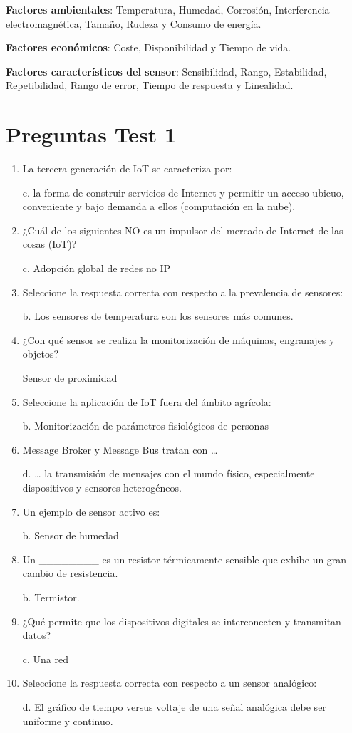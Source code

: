 \documentclass[12pt, twoside, openright]{report} %
\begin{document}
\textbf{Factores ambientales}: Temperatura, Humedad, Corrosión,
Interferencia electromagnética, Tamaño, Rudeza y Consumo de energía.

\textbf{Factores económicos}: Coste, Disponibilidad y Tiempo de vida.

\textbf{Factores característicos del sensor}: Sensibilidad, Rango,
Estabilidad, Repetibilidad, Rango de error, Tiempo de respuesta y
Linealidad.
\pagebreak
\section{Preguntas Test 1}
\begin{enumerate}
	\item La tercera generación de IoT se caracteriza por:

	      c. la forma de construir servicios de Internet y permitir un acceso ubicuo, conveniente y bajo demanda a ellos (computación en la nube).

	\item ¿Cuál de los siguientes NO es un impulsor del mercado de Internet de las cosas (IoT)?

	      c. Adopción global de redes no IP

	\item Seleccione la respuesta correcta con respecto a la prevalencia de sensores:

	      b. Los sensores de temperatura son los sensores más comunes.

	\item ¿Con qué sensor se realiza la monitorización de máquinas, engranajes y objetos?

	      Sensor de proximidad

	\item Seleccione la aplicación de IoT fuera del ámbito agrícola:

	      b. Monitorización de parámetros fisiológicos de personas

	\item Message Broker y Message Bus tratan con …

	      d. … la transmisión de mensajes con el mundo físico, especialmente dispositivos y sensores heterogéneos.

	\item Un ejemplo de sensor activo es:

	      b. Sensor de humedad

	\item Un \_\_\_\_\_\_\_\_ es un resistor térmicamente sensible que exhibe un gran cambio de resistencia.

	      b. Termistor.

	\item ¿Qué permite que los dispositivos digitales se interconecten y transmitan datos?

	      c. Una red

	\item Seleccione la respuesta correcta con respecto a un sensor analógico:

	      d. El gráfico de tiempo versus voltaje de una señal analógica debe ser uniforme y continuo.

\end{enumerate}
\end{document}
